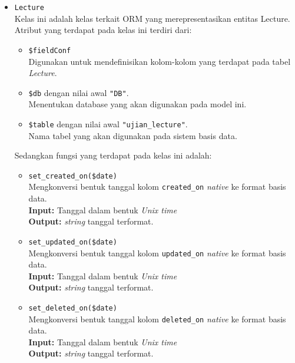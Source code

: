 \begin{itemize}
        \item \texttt{Lecture} \\
            Kelas ini adalah kelas terkait ORM yang merepresentasikan entitas
            Lecture. Atribut yang terdapat pada kelas ini terdiri dari:
            \begin{itemize}
                \item \texttt{\$fieldConf} \\
                    Digunakan untuk mendefinisikan kolom-kolom yang terdapat
                    pada tabel \textit{Lecture}.
                \item \texttt{\$db} dengan nilai awal \texttt{"DB"}. \\
                    Menentukan database yang akan digunakan pada model ini.
                \item \texttt{\$table} dengan nilai awal
                \texttt{"ujian\_lecture"}. \\
                    Nama tabel yang akan digunakan pada sistem basis data. 
            \end{itemize}
            Sedangkan fungsi yang terdapat pada kelas ini adalah:
            \begin{itemize}
                \item \texttt{set\_created\_on(\$date)} \\
                    Mengkonversi bentuk tanggal kolom \texttt{created\_on}
                    \textit{native} ke format basis data. \\
                    \textbf{Input:} Tanggal dalam bentuk \textit{Unix time}\\
                    \textbf{Output:} \textit{string} tanggal terformat.
                
                \item \texttt{set\_updated\_on(\$date)} \\
                    Mengkonversi bentuk tanggal kolom \texttt{updated\_on}
                    \textit{native} ke format basis data. \\
                    \textbf{Input:} Tanggal dalam bentuk \textit{Unix time}\\
                    \textbf{Output:} \textit{string} tanggal terformat.
                    
                \item \texttt{set\_deleted\_on(\$date)} \\
                    Mengkonversi bentuk tanggal kolom \texttt{deleted\_on}
                    \textit{native} ke format basis data. \\
                    \textbf{Input:} Tanggal dalam bentuk \textit{Unix time}\\
                    \textbf{Output:} \textit{string} tanggal terformat.
                    

\end{itemize}
\end{itemize}
